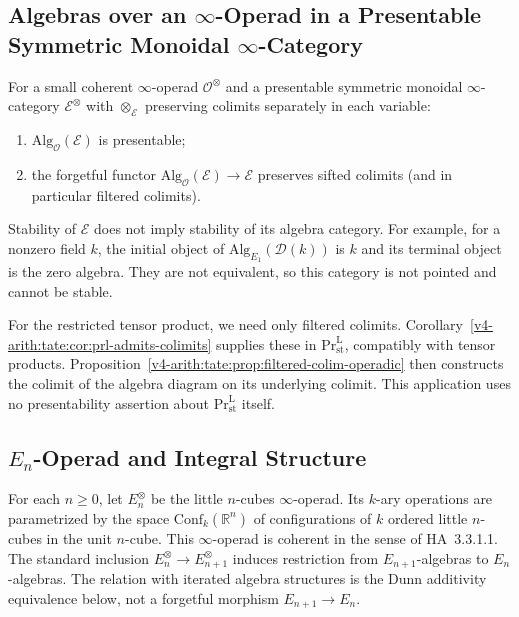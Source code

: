 \subsection{Algebras over an \(\infty\)-Operad in a Presentable Symmetric Monoidal \(\infty\)-Category}
\label{v4-arith:tate:prelim-alg}

\begin{theorem}[HA~3.2.3.1 and 3.2.3.5]
\label{v4-arith:tate:thm:alg-O-presentable}
\ClaimStatusProvedElsewhere For a small coherent \(\infty\)-operad
\(\mathcal{O}^{\otimes}\) and a presentable symmetric monoidal
\(\infty\)-category \(\mathcal{E}^{\otimes}\) with
\(\otimes_{\mathcal{E}}\) preserving colimits separately in each
variable:
\begin{enumerate}
\item \(\mathrm{Alg}_{\mathcal{O}}(\mathcal{E})\) is presentable;
\item the forgetful functor
\(\mathrm{Alg}_{\mathcal{O}}(\mathcal{E})\to\mathcal{E}\) preserves
sifted colimits (and in particular filtered colimits).
\end{enumerate}
\end{theorem}

Stability of \(\mathcal E\) does not imply stability of its algebra
category. For example, for a nonzero field \(k\), the initial object
of \(\mathrm{Alg}_{E_1}(\mathcal D(k))\) is \(k\) and its terminal
object is the zero algebra. They are not equivalent, so this
category is not pointed and cannot be stable.

For the restricted tensor product, we need only filtered colimits.
Corollary~\ref{v4-arith:tate:cor:prl-admits-colimits} supplies these
in \(\mathrm{Pr}^{\mathrm L}_{\mathrm{st}}\), compatibly with tensor
products. Proposition~\ref{v4-arith:tate:prop:filtered-colim-operadic}
then constructs the colimit of the algebra diagram on its underlying
colimit. This application uses no presentability assertion about
\(\mathrm{Pr}^{\mathrm L}_{\mathrm{st}}\) itself.

\subsection{\(E_{n}\)-Operad and Integral Structure}
\label{v4-arith:tate:prelim-En}

\begin{theorem}
\label{v4-arith:tate:thm:En-operad}
\ClaimStatusProvedElsewhere For each \(n\geq 0\), let
\(E_n^{\otimes}\) be the little \(n\)-cubes \(\infty\)-operad.
Its \(k\)-ary operations are parametrized by the space
\(\mathrm{Conf}_{k}(\mathbb{R}^{n})\) of configurations of \(k\) ordered
little \(n\)-cubes in the unit \(n\)-cube. This \(\infty\)-operad is
coherent in the sense of HA~3.3.1.1. The standard inclusion
\(E_n^{\otimes}\to E_{n+1}^{\otimes}\) induces restriction from
\(E_{n+1}\)-algebras to \(E_n\)-algebras. The relation with iterated
algebra structures is the Dunn additivity equivalence below,
not a forgetful morphism \(E_{n+1}\to E_n\).
\end{theorem}

